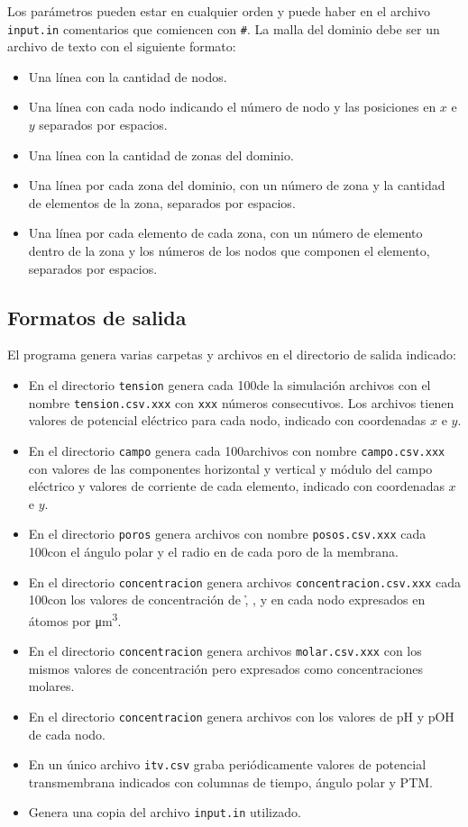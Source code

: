 Los parámetros pueden estar en cualquier orden y puede haber en el archivo \texttt{input.in} comentarios que comiencen con \texttt{\#}. La malla del dominio debe ser un archivo de texto con el siguiente formato:

\begin{itemize}
	\item Una línea con la cantidad de nodos.
	\item Una línea con cada nodo indicando el número de nodo y las posiciones en $x$ e $y$ separados por espacios.
	\item Una línea con la cantidad de zonas del dominio.
	\item Una línea por cada zona del dominio, con un número de zona y la cantidad de elementos de la zona, separados por espacios.
	\item Una línea por cada elemento de cada zona, con un número de elemento dentro de la zona y los números de los nodos que componen el elemento, separados por espacios.
\end{itemize}

\subsection*{Formatos de salida}

El programa genera varias carpetas y archivos en el directorio de salida indicado:

\begin{itemize}
	\item En el directorio \texttt{tension} genera cada 100\usec de la simulación archivos con el nombre \texttt{tension.csv.xxx} con \texttt{xxx} números consecutivos. Los archivos tienen valores de potencial eléctrico para cada nodo, indicado con coordenadas $x$ e $y$.
	\item En el directorio \texttt{campo} genera cada 100\usec archivos con nombre \texttt{campo.csv.xxx} con valores de las componentes horizontal y vertical y módulo del campo eléctrico y valores de corriente de cada elemento, indicado con coordenadas $x$ e $y$.
	\item En el directorio \texttt{poros} genera archivos con nombre \texttt{posos.csv.xxx} cada 100\usec con el ángulo polar y el radio en \um de cada poro de la membrana. 
	\item En el directorio \texttt{concentracion} genera archivos \texttt{concentracion.csv.xxx} cada 100\usec con los valores de concentración de \h, \oh, \na{} y \cl{} en cada nodo expresados en átomos por \si{\micro\metre\cubed}.
	\item En el directorio \texttt{concentracion} genera archivos \texttt{molar.csv.xxx} con los mismos valores de concentración pero expresados como concentraciones molares.
	\item En el directorio \texttt{concentracion} genera archivos con los valores de pH y pOH de cada nodo.
	\item En un único archivo \texttt{itv.csv} graba periódicamente valores de potencial transmembrana indicados con columnas de tiempo, ángulo polar y PTM.
	\item Genera una copia del archivo \texttt{input.in} utilizado.
\end{itemize}

